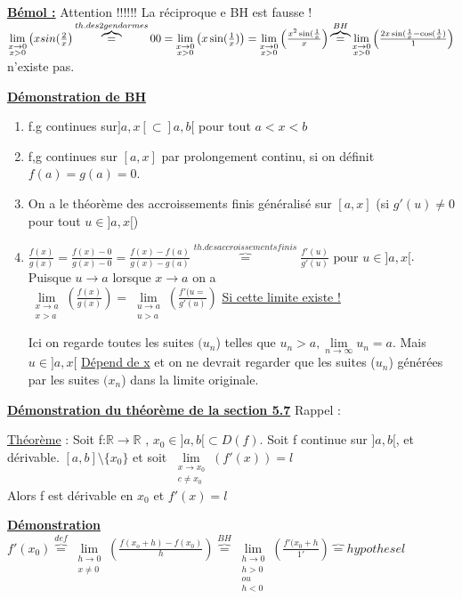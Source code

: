 \documentclass[12pt,a4paper]{article}
\newcommand{\limite}{\lim\limits_}
\newcommand{\llimite}[3]{\limite{\substack{#1 \\ #2}}\left(#3\right)}
\newcommand{\evid}[1]{\textbf{\underline{#1}}}
\newcommand{\ninf}{\ensuremath{n \to \infty}}
\newcommand{\R}{\ensuremath{\mathbb{R}} }
\newcommand{\rtor}{\ensuremath{\R \to \R} }
\newcommand{\pour}{\mbox{ pour }}
\newcommand{\Theoreme}{\underline{Théorème} }
\begin{document}
{\evid{Bémol :}
Attention !!!!!! La réciproque e BH est fausse !\\
$\llimite{x\to 0}{x > 0}{x \\sin(\frac{2}{x}} \overbrace{=}^{th. des 2 gendarmes} 0\\
0 = \llimite{x\to 0}{x > 0}{x\sin(\frac{1}{x})} = \llimite{x\to 0}{x >0}{\frac{x^2\sin(\frac{1}{x}}{x}} \overbrace{=}^{BH} \llimite{x\to 0}{x > 0}{\frac{2x\sin(\frac{1}{x} - \cos(\frac{1}{x})}{1}}$ n'existe pas.	

\evid{Démonstration de BH}
\begin{enumerate}[label=\roman*)]
	\item f.g continues sur$]a,x[ \subset ]a,b[$ pour tout $a < x<b$
	\item f,g continues sur $[a,x]$ par prolongement continu, si on définit $f(a) = g(a) = 0$.
	\item On a le théorème des accroissements finis généralisé sur $[a,x]$ (si $g'(u) \neq 0 $ pour tout $u \in ]a,x[$)
	\item $\frac{f(x)}{g(x)} = \frac{f(x) - 0}{g(x) - 0} = \frac{f(x)-f(a)}{g(x)-g(a)} \overbrace{=}^{th. des accroissements finis} \frac{f'(u)}{g'(u)} \pour u \in ]a,x[$.\\
	Puisque $u \to a$ lorsque $x\to a$ on a \\
	$\llimite{x\to a}{x > a}{\frac{f(x)}{g(x)}} = \llimite{u \to a}{u > a}{\frac{f'(u=}{g'(u)}}$ \underline{Si cette limite existe !}\\
	\begin{boite}
	Ici on regarde toutes les suites $(u_n$) telles que $u_n  > a, \limite{\ninf}u_n = a$. Mais $u \in ]a,x[$ \underline{Dépend de x} et on ne devrait regarder que les suites ($u_n$) générées par les suites $(x_n$) dans la limite originale.
	\end{boite}
\end{enumerate}
\evid{Démonstration du théorème de la section 5.7}
Rappel : \begin{boite}
	\Theoreme : Soit f:\rtor, $x_0 \in ]a,b[ \subset D(f)$. Soit f continue sur $]a,b[$, et dérivable. $[a,b]\setminus\{x_0\}$ et soit $\llimite{x \to x_0}{c \neq x_0}{f'(x)} = l$\\
	Alors f est dérivable en $x_0$ et $f'(x) 
	= l$
\end{boite}
\evid{Démonstration}
$f'(x_0) \overbrace{=}^{def} \llimite{h \to 0}{x \neq 0}{\frac{f(x_o+h) - f(x_0)}{h}} \overbrace{=}^{BH} \limite{\substack{h\to 0 \\ h > 0 \\ ou \\ h < 0}} \left( \frac{f'(x_0+h}{1'}\right) \overbrace{=}{hypothese} l$
}
\end{document}

